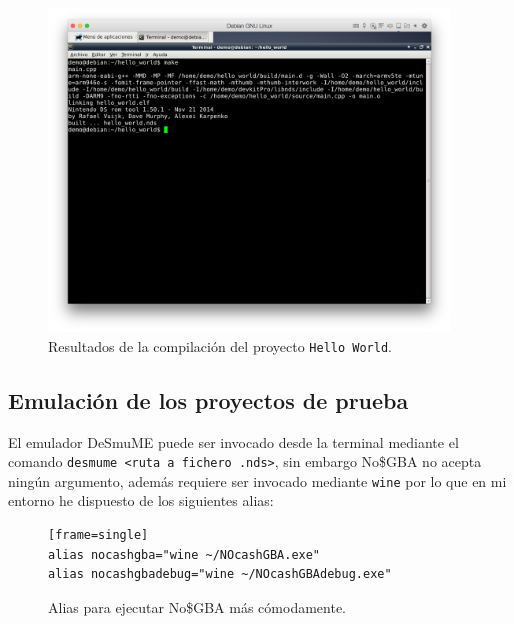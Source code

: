 \documentclass[12pt,english]{article}
\begin{document}
\begin{figure}[h!]
	\caption{Resultados de la compilación del proyecto {\tt Hello World}.}
	\label{fig:dependency}
	\centering
	\includegraphics[width=0.95\textwidth]{P1Media/Compilado}
\end{figure}
	
	\subsection{Emulación de los proyectos de prueba}
	
	El emulador DeSmuME puede ser invocado desde la terminal mediante el comando {\tt desmume <ruta a fichero .nds>}, sin embargo No\$GBA no acepta ningún argumento, además requiere ser invocado mediante {\tt wine} por lo que en mi entorno he dispuesto de los siguientes alias:
	
\begin{figure}[ht]
\begin{verbatim}[frame=single]
alias nocashgba="wine ~/NOcashGBA.exe"
alias nocashgbadebug="wine ~/NOcashGBAdebug.exe"
\end{verbatim}
	\label{fig:nocashAlias}
	\caption{Alias para ejecutar No\$GBA más cómodamente.}
\end{figure}
	
\end{document}
